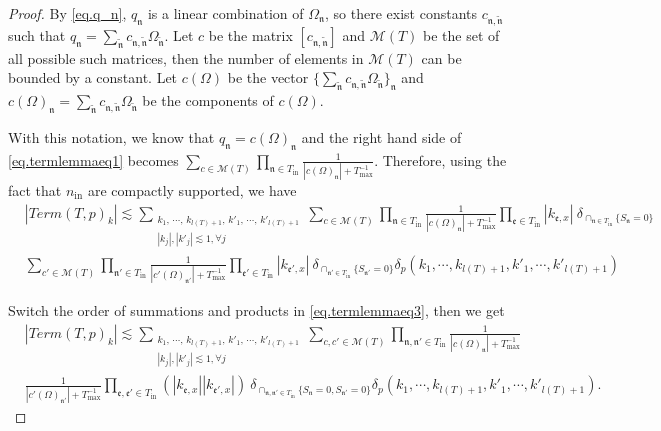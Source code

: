 \begin{proof}
By \eqref{eq.q_n}, $q_{\mathfrak{n}}$ is a linear combination of $\Omega_{\mathfrak{n}}$, so there exist constants $c_{\mathfrak{n},\widetilde{\mathfrak{n}}}$ such that $q_{\mathfrak{n}}=\sum_{\widetilde{\mathfrak{n}}}c_{\mathfrak{n},\widetilde{\mathfrak{n}}}\Omega_{\widetilde{\mathfrak{n}}}$. Let $c$ be the matrix $[c_{\mathfrak{n},\widetilde{\mathfrak{n}}}]$ and $\mathscr{M}(T)$ be the set of all possible such matrices, then the number of elements in $\mathscr{M}(T)$ can be bounded by a constant. Let $c(\Omega)$ be the vector $\{\sum_{\widetilde{\mathfrak{n}}}c_{\mathfrak{n},\widetilde{\mathfrak{n}}}\Omega_{\widetilde{\mathfrak{n}}}\}_{\mathfrak{n}}$ and $c(\Omega)_{\mathfrak{n}}=\sum_{\widetilde{\mathfrak{n}}}c_{\mathfrak{n},\widetilde{\mathfrak{n}}}\Omega_{\widetilde{\mathfrak{n}}}$ be the components of $c(\Omega)$.

With this notation, we know that $q_{\mathfrak{n}}=c(\Omega)_{\mathfrak{n}}$ and the right hand side of \eqref{eq.termlemmaeq1} becomes $\sum_{c\in \mathscr{M}(T) }\prod_{\mathfrak{n}\in T_{\text{in}}} \frac{1}{|c(\Omega)_{\mathfrak{n}}|+T^{-1}_{\text{max}}}$. Therefore, using the fact that $n_{\textrm{in}}$ are compactly supported, we have
\begin{equation}\label{eq.termlemmaeq3}
\begin{split}
    &|Term(T, p)_k|\lesssim \sum_{\substack{k_1,\, \cdots,\, k_{l(T)+1},\, k'_1,\, \cdots,\, k'_{l(T)+1}\\ |k_{j}|, |k'_j|\lesssim 1, \forall j}} \sum_{c\in \mathscr{M}(T) }\prod_{\mathfrak{n}\in T_{\text{in}}}\frac{1}{|c(\Omega)_{\mathfrak{n}}|+T^{-1}_{\text{max}}} \prod_{\mathfrak{e}\in T_{\text{in}}} |k_{\mathfrak{e},x}|\ \delta_{\cap_{\mathfrak{n}\in T_{\text{in}}} \{S_{\mathfrak{n}}=0\}} 
    \\
    &\sum_{c'\in \mathscr{M}(T)}\prod_{\mathfrak{n}'\in T_{\text{in}}}\frac{1}{|c'(\Omega)_{\mathfrak{n}'}|+T^{-1}_{\text{max}}}\prod_{\mathfrak{e}'\in T_{\text{in}}}|k_{\mathfrak{e}',x}|\ \delta_{\cap_{\mathfrak{n}'\in T_{\text{in}}} \{S_{\mathfrak{n}'}=0\}} \delta_{p}(k_1,\cdots, k_{l(T)+1}, k'_1,\cdots, k'_{l(T)+1})
\end{split}
\end{equation}

Switch the order of summations and products in \eqref{eq.termlemmaeq3}, then we get
\begin{equation}\label{eq.termlemmaeq2}
\begin{split}
    &|Term(T, p)_k|\lesssim \sum_{\substack{k_1,\, \cdots,\, k_{l(T)+1},\, k'_1,\, \cdots,\, k'_{l(T)+1}\\ |k_{j}|, |k'_j|\lesssim 1, \forall j}} \sum_{c, c'\in \mathscr{M}(T) }\prod_{\mathfrak{n}, \mathfrak{n}'\in T_{\text{in}}}\frac{1}{|c(\Omega)_{\mathfrak{n}}|+T^{-1}_{\text{max}}}
    \\
    &\frac{1}{|c'(\Omega)_{\mathfrak{n}'}|+T^{-1}_{\text{max}}}\prod_{\mathfrak{e},\mathfrak{e}'\in T_{\text{in}}}(|k_{\mathfrak{e},x}||k_{\mathfrak{e}',x}|)\ \delta_{\cap_{\mathfrak{n},\mathfrak{n}'\in T_{\text{in}}} \{S_{\mathfrak{n}}=0, S_{\mathfrak{n}'}=0\}} \delta_{p}(k_1,\cdots, k_{l(T)+1}, k'_1,\cdots, k'_{l(T)+1}).
\end{split}
\end{equation}


\end{proof}
